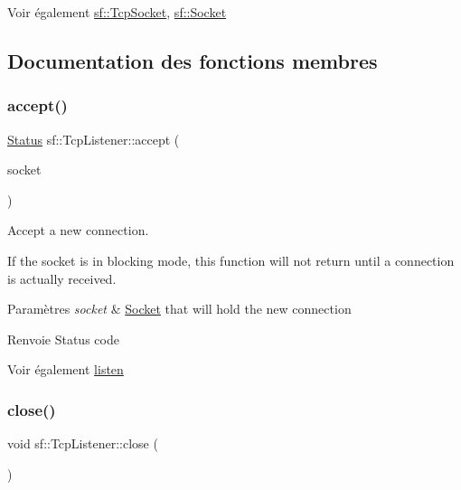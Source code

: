 \begin{DoxySeeAlso}{Voir également}
\hyperlink{classsf_1_1TcpSocket}{sf\+::\+Tcp\+Socket}, \hyperlink{classsf_1_1Socket}{sf\+::\+Socket} 
\end{DoxySeeAlso}


\subsection{Documentation des fonctions membres}
\mbox{\label{classsf_1_1TcpListener_ae2c83ce5a64d50b68180c46bef0a7346}} 
\subsubsection{\texorpdfstring{accept()}{accept()}}
{\footnotesize\ttfamily \hyperlink{classsf_1_1Socket_a51bf0fd51057b98a10fbb866246176dc}{Status} sf\+::\+Tcp\+Listener\+::accept (\begin{DoxyParamCaption}\item[{\hyperlink{classsf_1_1TcpSocket}{Tcp\+Socket} \&}]{socket }\end{DoxyParamCaption})}



Accept a new connection. 

If the socket is in blocking mode, this function will not return until a connection is actually received.


\begin{DoxyParams}{Paramètres}
{\em socket} & \hyperlink{classsf_1_1Socket}{Socket} that will hold the new connection\\
\hline
\end{DoxyParams}
\begin{DoxyReturn}{Renvoie}
Status code
\end{DoxyReturn}
\begin{DoxySeeAlso}{Voir également}
\hyperlink{classsf_1_1TcpListener_a409d9350d3abfea9636df8cf4a61004e}{listen} 
\end{DoxySeeAlso}
\mbox{\label{classsf_1_1TcpListener_a3a00a850506bd0f9f48867a0fe59556b}} 
\subsubsection{\texorpdfstring{close()}{close()}}
{\footnotesize\ttfamily void sf\+::\+Tcp\+Listener\+::close (\begin{DoxyParamCaption}{ }\end{DoxyParamCaption})}



